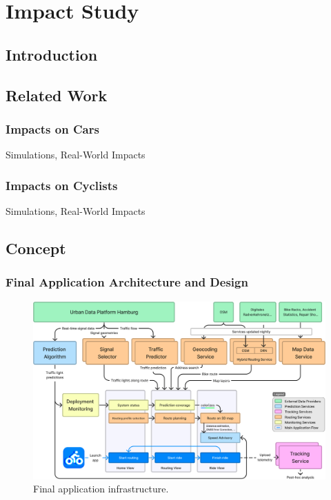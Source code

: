 \chapter{Impact Study}\label{ch:impacts}

\section{Introduction}

\section{Related Work}

\subsection{Impacts on Cars}

Simulations, Real-World Impacts

\subsection{Impacts on Cyclists}

Simulations, Real-World Impacts

\section{Concept}

\subsection{Final Application Architecture and Design}

\begin{figure}[htbp]
\caption{Final application infrastructure.}\label{fig:architecture}
\includegraphics[width=\linewidth]{images/architecture.png}
\end{figure}

